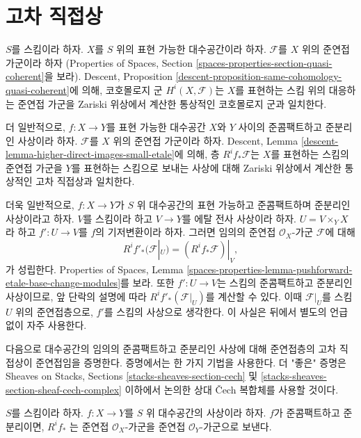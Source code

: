 \section{고차 직접상}
\label{section-higher-direct-image}

\noindent
$S$를 스킴이라 하자. $X$를 $S$ 위의 표현 가능한 대수공간이라 하자.
$\mathcal{F}$를 $X$ 위의 준연접 가군이라 하자
(Properties of Spaces, Section
\ref{spaces-properties-section-quasi-coherent}을 보라).
Descent, Proposition
\ref{descent-proposition-same-cohomology-quasi-coherent}에 의해,
코호몰로지 군 $H^i(X, \mathcal{F})$는 $X$를 표현하는 스킴 위의
대응하는 준연접 가군을 Zariski 위상에서 계산한 통상적인
코호몰로지 군과 일치한다.

\medskip\noindent
더 일반적으로, $f : X \to Y$를 표현 가능한 대수공간 $X$와 $Y$
사이의 준콤팩트하고 준분리인 사상이라 하자.
$\mathcal{F}$를 $X$ 위의 준연접 가군이라 하자.
Descent, Lemma \ref{descent-lemma-higher-direct-images-small-etale}에 의해,
층 $R^if_*\mathcal{F}$는 $X$를 표현하는 스킴의 준연접 가군을
$Y$를 표현하는 스킴으로 보내는 사상에 대해 Zariski 위상에서 계산한
통상적인 고차 직접상과 일치한다.

\medskip\noindent
더욱 일반적으로, $f : X \to Y$가 $S$ 위 대수공간의
표현 가능하고 준콤팩트하며 준분리인 사상이라고 하자.
$V$를 스킴이라 하고 $V \to Y$를 에탈 전사 사상이라 하자.
$U = V \times_Y X$라 하고 $f' : U \to V$를 $f$의 기저변환이라 하자.
그러면 임의의 준연접 $\mathcal{O}_X$-가군 $\mathcal{F}$에 대해
\begin{equation}
\label{equation-representable-higher-direct-image}
R^if'_*(\mathcal{F}|_U) = (R^if_*\mathcal{F})|_V,
\end{equation}
가 성립한다. Properties of Spaces, Lemma
\ref{spaces-properties-lemma-pushforward-etale-base-change-modules}를 보라.
또한 $f' : U \to V$는 스킴의 준콤팩트하고 준분리인 사상이므로,
앞 단락의 설명에 따라 $R^if'_*(\mathcal{F}|_U)$를 계산할 수 있다.
이때 $\mathcal{F}|_U$를 스킴 $U$ 위의 준연접층으로,
$f'$를 스킴의 사상으로 생각한다.
이 사실은 뒤에서 별도의 언급 없이 자주 사용한다.

\medskip\noindent
다음으로 대수공간의 임의의 준콤팩트하고 준분리인 사상에 대해
준연접층의 고차 직접상이 준연접임을 증명한다.
증명에서는 한 가지 기법을 사용한다. 더 "좋은" 증명은
Sheaves on Stacks, Sections \ref{stacks-sheaves-section-cech} 및
\ref{stacks-sheaves-section-sheaf-cech-complex} 이하에서 논의한
상대 {\v C}ech 복합체를 사용할 것이다.

\begin{lemma}
\label{lemma-higher-direct-image}
$S$를 스킴이라 하자. $f : X \to Y$를 $S$ 위 대수공간의
사상이라 하자. $f$가 준콤팩트하고 준분리이면, $R^if_*$
는 준연접 $\mathcal{O}_X$-가군을 준연접
$\mathcal{O}_Y$-가군으로 보낸다.
\end{lemma}

